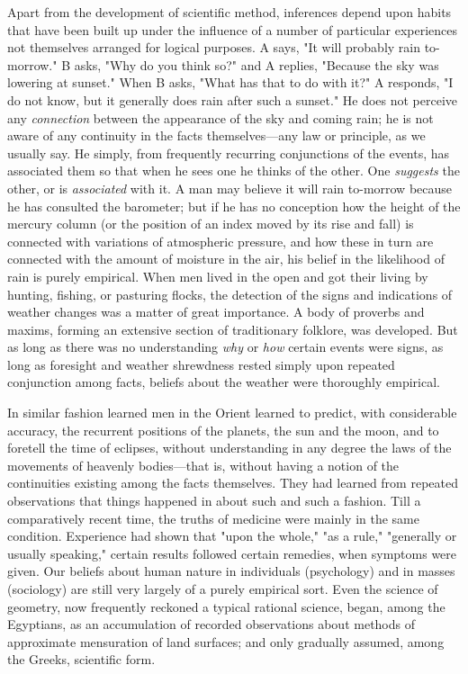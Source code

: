 \documentclass[showtrims,ustradepaper]{memoir}
\begin{document}

Apart from the development of scientific method, inferences depend upon
habits that have been built up under the influence of a number of
particular experiences not themselves arranged for logical purposes. A
says, "It will probably rain to-morrow." B asks, "Why do you think so?"
and A replies, "Because the sky was lowering at sunset." When B asks,
"What has that to do with it?" A responds, "I do not know, but it
generally does rain after such a sunset." He does not perceive any
\emph{connection} between the appearance of the sky and coming rain; he
is not aware of any continuity in the facts themselves---any law or
principle, as we usually say. He simply, from frequently recurring
conjunctions of the events, has associated them so that when he sees one
he thinks of the other. One \emph{suggests} the other, or is
\emph{associated} with it. A man may believe it will rain to-morrow
because he has consulted the barometer; but if he has no conception how
the height of the mercury column (or the position of an index moved by
its rise and fall) is connected with variations of atmospheric pressure,
and how these in turn are connected with the amount of moisture in the
air, his belief in the likelihood of rain is purely empirical. When men
lived in the open and got their living by hunting, fishing,
or
pasturing flocks, the detection of the signs and indications of weather
changes was a matter of great importance. A body of proverbs and maxims,
forming an extensive section of traditionary folklore, was developed.
But as long as there was no understanding \emph{why} or \emph{how}
certain events were signs, as long as foresight and weather shrewdness
rested simply upon repeated conjunction among facts, beliefs about the
weather were thoroughly empirical.


In similar fashion learned men in the Orient learned to predict, with
considerable accuracy, the recurrent positions of the planets, the sun
and the moon, and to foretell the time of eclipses, without
understanding in any degree the laws of the movements of heavenly
bodies---that is, without having a notion of the continuities existing
among the facts themselves. They had learned from repeated observations
that things happened in about such and such a fashion. Till a
comparatively recent time, the truths of medicine were mainly in the
same condition. Experience had shown that "upon the whole," "as a rule,"
"generally or usually speaking," certain results followed certain
remedies, when symptoms were given. Our beliefs about human nature in
individuals (psychology) and in masses (sociology) are still very
largely of a purely empirical sort. Even the science of geometry, now
frequently reckoned a typical rational science, began, among the
Egyptians, as an accumulation of recorded observations about methods of
approximate mensuration of land surfaces; and only gradually assumed,
among the Greeks, scientific form.
\end{document}

